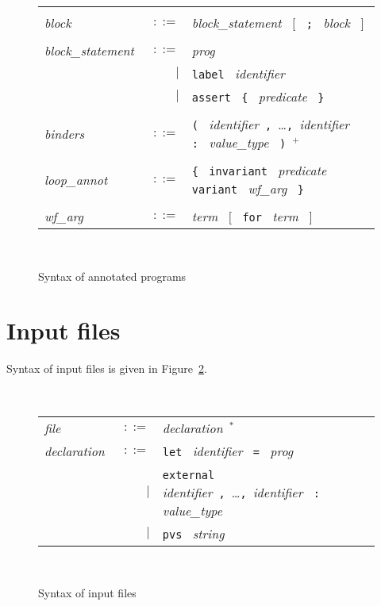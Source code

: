 \documentclass[a4paper,12pt]{report}
\newcommand{\te}[1]{\texttt{#1}~}
\newcommand{\nt}[1]{\textsl{#1}~}
\begin{document}
\begin{figure}[htbp]
\begin{center}
\begin{tabular}{lrl}
      & & \\[0.1em]

  \nt{block} 
    & $::=$ & \nt{block\_statement}  $[$~ \te{;} \nt{block} $]$ \\

      & & \\[0.1em]

  \nt{block\_statement}
    & $::=$ & \nt{prog} \\
      & $|$ & \te{label}  \nt{identifier} \\
      & $|$ & \te{assert}  \te{\{}  \nt{predicate}  \te{\}} \\

      & & \\[0.1em]

  \nt{binders}
    & $::=$ & \te{(} \nt{identifier}\te{,}\dots\te{,}\nt{identifier}  \te{:}
              \nt{value\_type}  \te{)}$^+$ \\
  \\[0.1em]

  \nt{loop\_annot}
    & $::=$ & \te{\{}  \te{invariant}  \nt{predicate} 
              \te{variant}  \nt{wf\_arg}  \te{\}} \\
      & & \\[0.1em]

  \nt{wf\_arg} 
    & $::=$ & \nt{term}  $[$~ \te{for} \nt{term} $]$ \\

\end{tabular}\\
\hrulefill
\caption{Syntax of annotated programs}
\label{fig:caml}
\end{center}
\end{figure}

\section{Input files}

Syntax of input files is given in Figure~\ref{fig:input}.

\begin{figure}[htbp]
\begin{center}
\hrulefill\\
\begin{tabular}{lrl}
  \nt{file}
    & $::=$ & \nt{declaration}$^*$
  \\[0.1em]

  \nt{declaration}
    & $::=$ & \te{let} \nt{identifier} \te{=} \nt{prog} \\
      & $|$ & \te{external} \nt{identifier}\te{,}\dots\te{,}\nt{identifier}
              \te{:} \nt{value\_type} \\
      & $|$ & \te{pvs} \nt{string}
\end{tabular}\\
\hrulefill
\caption{Syntax of input files}
\label{fig:input}
\end{center}            
\end{figure}
\end{document}
